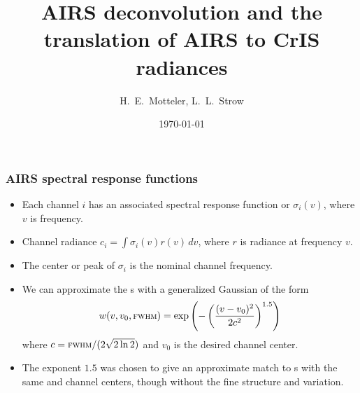 \documentclass[10pt]{beamer}
\title{AIRS deconvolution and the \\
       translation of AIRS to CrIS radiances \\ 
}
\author{H.~E.~Motteler, L.~L.~Strow}
\institute{
  UMBC Atmospheric Spectroscopy Lab \\
  Joint Center for Earth Systems Technology \\
}
\date{\today}
\begin{document}
\begin{frame}[plain]
\titlepage
\end{frame}
\begin{frame}
\frametitle{AIRS spectral response functions}
\begin{itemize}

  \item Each {\airs} channel $i$ has an associated spectral response
    function or {\srf} $\sigma_i(v)$, where $v$ is frequency.

  \item Channel radiance $c_i = \int \sigma_i(v)r(v)\,dv$, where $r$
    is radiance at frequency $v$.

  \item The center or peak of $\sigma_i$ is the nominal channel
    frequency.

  \item We can approximate the {\airs} {\srf}s with a generalized
    Gaussian of the form \[w(v, v_0, \mbox{\small\textsc{fwhm}}) =
    \exp\left(-\left(\frac{(v - v_0)^2}{2c^2}\right)^{1.5}\right) \]
    where $c=\mbox{\small\textsc{fwhm}} / (2\sqrt{2\ln 2})$ and $v_0$ is the desired
    channel center.

  \item The exponent $1.5$ was chosen to give an approximate match
    to {\airs} {\srf}s with the same {\FWHM} and channel centers,
    though without the fine structure and variation.

\end{itemize}
\end{frame}
\end{document}
